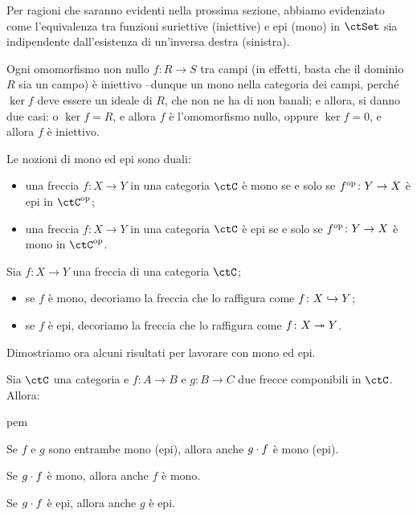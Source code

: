 Per ragioni che saranno evidenti nella prossima sezione,
abbiamo evidenziato come l'equivalenza tra funzioni suriettive (iniettive)
e epi (mono) in \(\ctSet\) sia indipendente dall'esistenza di un'inversa destra (sinistra).
\begin{remark}
 Ogni omomorfismo non nullo \(f \colon R\to S\) tra campi (in effetti, basta che il dominio \(R\) sia un campo) è iniettivo --dunque un mono nella categoria dei campi, perché \(\ker f\) deve essere un ideale di \(R\), che non ne ha di non banali; e allora, si danno due casi: o \(\ker f=R\), e allora \(f\) è l'omomorfismo nullo, oppure \(\ker f = 0\), e allora \(f\) è iniettivo.
\end{remark}
\begin{remark}
 \label{rmk:mono-epi-duality}
 Le nozioni di mono ed epi sono duali:
 \begin{itemize}
  \item una freccia \(f \colon X\to Y\) in una categoria \(\ctC\) è mono se e solo se \(f^{\text{op}} \colon Y\to X\) è epi in \(\ctC^{\op}\);
  \item una freccia \(f \colon X\to Y\) in una categoria \(\ctC\) è epi se e solo se \(f^{\text{op}} \colon Y\to X\) è mono in \(\ctC^{\op}\).
 \end{itemize}
\end{remark}
\begin{notation}
 Sia \(f \colon X\to Y\) una freccia di una categoria \(\ctC\);
 \begin{itemize}
  \item se \(f\) è mono, decoriamo la freccia che lo raffigura come \(f \colon X\hookrightarrow Y\);
  \item se \(f\) è epi, decoriamo la freccia che lo raffigura come \(f \colon X\twoheadrightarrow Y\).
 \end{itemize}
\end{notation}
Dimostriamo ora alcuni risultati per lavorare con mono ed epi.
\begin{proposition}\label{canc_monoepi}
 Sia \(\ctC\) una categoria e \(f \colon A \to B\) e \(g \colon B \to C\) due frecce componibili in \(\ctC\).
 Allora:
 \begin{enumtag}{pem}
  \item \label{pem_1} Se \(f\) e \(g\) sono entrambe mono (epi), allora anche \(g \cdot f\) è mono (epi).
  \item \label{pem_2} Se \(g \cdot f\) è mono, allora anche \(f\) è mono.
  \item \label{pem_3} Se \(g \cdot f\) è epi, allora anche \(g\) è epi.
 \end{enumtag}
\end{proposition}
